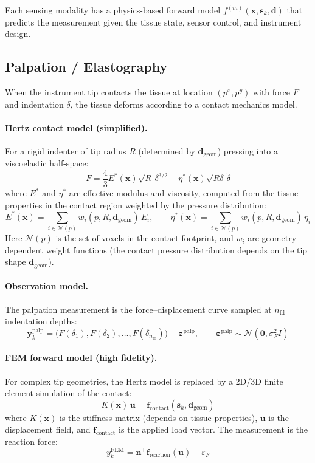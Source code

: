\documentclass[11pt,a4paper]{article}
\theoremstyle{definition}
\begin{document}
Each sensing modality has a physics-based forward model $f^{(m)}(\bm{x}, \bm{s}_k, \bm{d})$ that predicts the measurement given the tissue state, sensor control, and instrument design.

\subsection{Palpation / Elastography}

When the instrument tip contacts the tissue at location $(p^x, p^y)$ with force $F$ and indentation $\delta$, the tissue deforms according to a contact mechanics model.

\paragraph{Hertz contact model (simplified).}
For a rigid indenter of tip radius $R$ (determined by $\bm{d}_{\text{geom}}$) pressing into a viscoelastic half-space:
\[
  F = \frac{4}{3} E^*(\bm{x}) \sqrt{R} \, \delta^{3/2} + \eta^*(\bm{x}) \sqrt{R \delta} \, \dot{\delta}
\]
where $E^*$ and $\eta^*$ are effective modulus and viscosity, computed from the tissue properties in the contact region weighted by the pressure distribution:
\[
  E^*(\bm{x}) = \sum_{i \in \mathcal{N}(p)} w_i(p, R, \bm{d}_{\text{geom}}) \, E_i, \qquad
  \eta^*(\bm{x}) = \sum_{i \in \mathcal{N}(p)} w_i(p, R, \bm{d}_{\text{geom}}) \, \eta_i
\]
Here $\mathcal{N}(p)$ is the set of voxels in the contact footprint, and $w_i$ are geometry-dependent weight functions (the contact pressure distribution depends on the tip shape $\bm{d}_{\text{geom}}$).

\paragraph{Observation model.}
The palpation measurement is the force--displacement curve sampled at $n_{\text{fd}}$ indentation depths:
\[
  \bm{y}^{\text{palp}}_k = \big(F(\delta_1), F(\delta_2), \ldots, F(\delta_{n_{\text{fd}}})\big) + \bm{\varepsilon}^{\text{palp}}, \qquad \bm{\varepsilon}^{\text{palp}} \sim \mathcal{N}(\bm{0}, \sigma_F^2 I)
\]

\paragraph{FEM forward model (high fidelity).}
For complex tip geometries, the Hertz model is replaced by a 2D/3D finite element simulation of the contact:
\[
  K(\bm{x}) \, \bm{u} = \bm{f}_{\text{contact}}(\bm{s}_k, \bm{d}_{\text{geom}})
\]
where $K(\bm{x})$ is the stiffness matrix (depends on tissue properties), $\bm{u}$ is the displacement field, and $\bm{f}_{\text{contact}}$ is the applied load vector.  The measurement is the reaction force:
\[
  y^{\text{FEM}}_k = \bm{n}^\top \bm{f}_{\text{reaction}}(\bm{u}) + \varepsilon_F
\]
\end{document}
